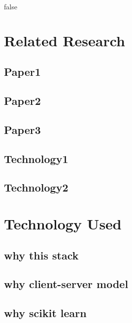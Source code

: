 \if false

\section{Related Research}

\subsection{Paper1}
\subsection{Paper2}
\subsection{Paper3}
\subsection{Technology1}
\subsection{Technology2}

\section{Technology Used}
\subsection{why this stack}
\subsection{why client-server model}
\subsection{why scikit learn}

\fi


